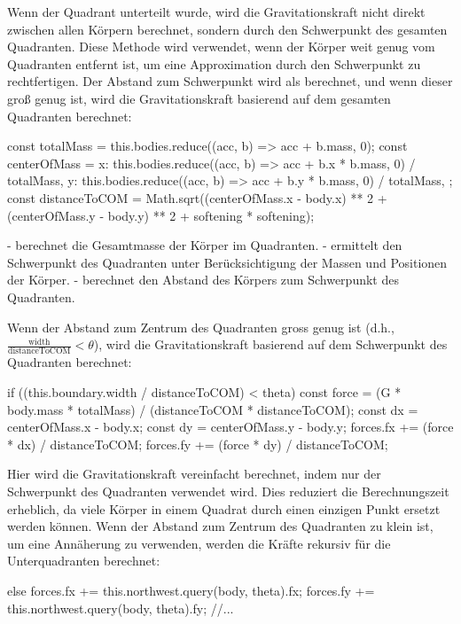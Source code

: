 \documentclass[a4paper,12pt,twoside]{article}
\begin{document}
Wenn der Quadrant unterteilt wurde, wird die Gravitationskraft nicht direkt zwischen allen Körpern berechnet, sondern durch den Schwerpunkt des gesamten Quadranten. Diese Methode wird verwendet, wenn der Körper weit genug vom Quadranten entfernt ist, um eine Approximation durch den Schwerpunkt zu rechtfertigen. Der Abstand zum Schwerpunkt wird als  berechnet, und wenn dieser groß genug ist, wird die Gravitationskraft basierend auf dem gesamten Quadranten berechnet:

\begin{javascript}
const totalMass = this.bodies.reduce((acc, b) => acc + b.mass, 0);
const centerOfMass = {
  x: this.bodies.reduce((acc, b) => acc + b.x * b.mass, 0) / totalMass,
  y: this.bodies.reduce((acc, b) => acc + b.y * b.mass, 0) / totalMass,
};
const distanceToCOM = Math.sqrt((centerOfMass.x - body.x) ** 2 + (centerOfMass.y - body.y) ** 2 + softening * softening);
\end{javascript}

-  berechnet die Gesamtmasse der Körper im Quadranten.
-  ermittelt den Schwerpunkt des Quadranten unter Berücksichtigung der Massen und Positionen der Körper.
-  berechnet den Abstand des Körpers zum Schwerpunkt des Quadranten.

Wenn der Abstand zum Zentrum des Quadranten gross genug ist (d.h., \( \frac{\text{width}}{\text{distanceToCOM}} < \theta \)), wird die Gravitationskraft basierend auf dem Schwerpunkt des Quadranten berechnet:

\begin{javascript}
if ((this.boundary.width / distanceToCOM) < theta) {
    const force = (G * body.mass * totalMass) / (distanceToCOM * distanceToCOM);
    const dx = centerOfMass.x - body.x;
    const dy = centerOfMass.y - body.y;
    forces.fx += (force * dx) / distanceToCOM;
    forces.fy += (force * dy) / distanceToCOM;
}
\end{javascript}

Hier wird die Gravitationskraft vereinfacht berechnet, indem nur der Schwerpunkt des Quadranten verwendet wird. Dies reduziert die Berechnungszeit erheblich, da viele Körper in einem Quadrat durch einen einzigen Punkt ersetzt werden können.
Wenn der Abstand zum Zentrum des Quadranten zu klein ist, um eine Annäherung zu verwenden, werden die Kräfte rekursiv für die Unterquadranten berechnet:

\begin{javascript}
else {
    forces.fx += this.northwest.query(body, theta).fx;
    forces.fy += this.northwest.query(body, theta).fy;
    //...
}
\end{javascript}
\end{document}
